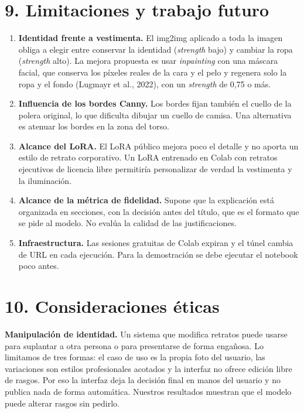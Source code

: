 \documentclass[conference]{IEEEtran}
\begin{document}
\section*{9. Limitaciones y trabajo futuro}

\begin{enumerate}
\item \textbf{Identidad frente a vestimenta.} El img2img aplicado a toda la imagen obliga a elegir entre conservar la identidad (\emph{strength} bajo) y cambiar la ropa (\emph{strength} alto). La mejora propuesta es usar \emph{inpainting} con una máscara facial, que conserva los píxeles reales de la cara y el pelo y regenera solo la ropa y el fondo (Lugmayr et al., 2022), con un \emph{strength} de 0,75 o más.
\item \textbf{Influencia de los bordes Canny.} Los bordes fijan también el cuello de la polera original, lo que dificulta dibujar un cuello de camisa. Una alternativa es atenuar los bordes en la zona del torso.
\item \textbf{Alcance del LoRA.} El LoRA público mejora poco el detalle y no aporta un estilo de retrato corporativo. Un LoRA entrenado en Colab con retratos ejecutivos de licencia libre permitiría personalizar de verdad la vestimenta y la iluminación.
\item \textbf{Alcance de la métrica de fidelidad.} Supone que la explicación está organizada en secciones, con la decisión antes del título, que es el formato que se pide al modelo. No evalúa la calidad de las justificaciones.
\item \textbf{Infraestructura.} Las sesiones gratuitas de Colab expiran y el túnel cambia de URL en cada ejecución. Para la demostración se debe ejecutar el notebook poco antes.
\end{enumerate}

\section*{10. Consideraciones éticas}

\textbf{Manipulación de identidad.} Un sistema que modifica retratos puede usarse para suplantar a otra persona o para presentarse de forma engañosa. Lo limitamos de tres formas: el caso de uso es la propia foto del usuario, las variaciones son estilos profesionales acotados y la interfaz no ofrece edición libre de rasgos. Por eso la interfaz deja la decisión final en manos del usuario y no publica nada de forma automática. Nuestros resultados muestran que el modelo puede alterar rasgos sin pedirlo.
\end{document}
